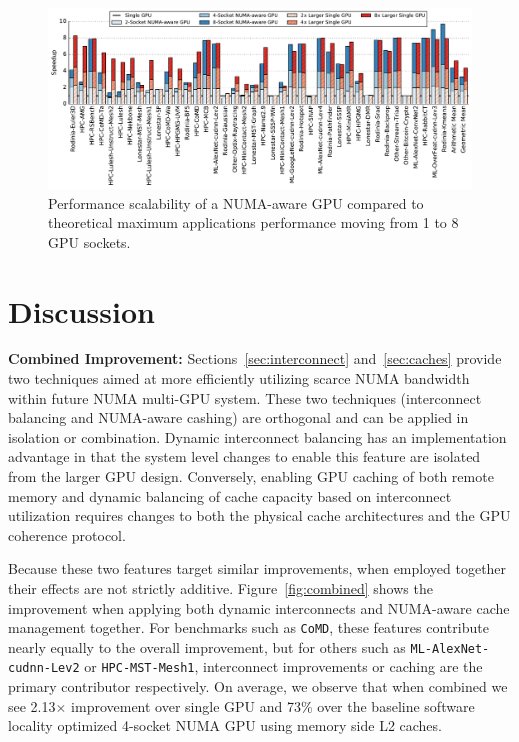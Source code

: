 \begin{figure}[t]
    \centering
    \includegraphics[width=1.0\textwidth]{figures/plot_scalability_mgpu_WB.pdf}
    \caption{Performance scalability of a NUMA-aware GPU compared to theoretical 
    maximum applications performance moving from 1 to 8 GPU sockets.}
    \label{fig:scalability}
    \vspace{-.2in}
\end{figure}

\section {Discussion}
\label{sec:discussion}
\textbf{Combined Improvement:} Sections~\ref{sec:interconnect} 
and~\ref{sec:caches} provide two techniques aimed at more efficiently utilizing 
scarce NUMA bandwidth within future NUMA multi-GPU system. These two 
techniques (interconnect balancing and NUMA-aware cashing) are orthogonal and 
can be applied in isolation or combination.  Dynamic interconnect balancing 
has an implementation advantage in that the system level changes to enable 
this feature are isolated from the larger GPU design.  Conversely, enabling 
GPU caching of both remote memory and dynamic balancing of cache capacity 
based on interconnect utilization requires changes to both the physical cache 
architectures and the GPU coherence protocol.

Because these two features target similar improvements, when employed 
together their effects are not strictly additive.  Figure~\ref{fig:combined} 
shows the improvement when applying both dynamic interconnects and NUMA-aware 
cache management together.  For benchmarks such as \texttt{CoMD}, these 
features contribute nearly equally to the overall improvement, but for others 
such as \texttt{ML-AlexNet-cudnn-Lev2} or \texttt{HPC-MST-Mesh1}, 
interconnect improvements or caching are the primary contributor 
respectively.  On average, we observe that when combined we see 2.13$\times$ improvement over single GPU and 73\% 
over the baseline software locality optimized 4-socket NUMA GPU 
using memory side L2 caches.

